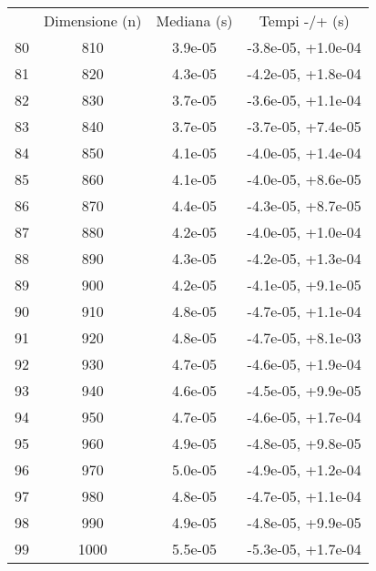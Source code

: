 \begin{table}
\centering
\begin{adjustbox}{width=1\textwidth/2}
\begin{tabular}{|c|c|c|c|}
\hline
 & Dimensione (n) & Mediana (s) & Tempi -/+ (s) \\
80 & 810 & 3.9e-05 & -3.8e-05, +1.0e-04 \\
\cline{1-4}
81 & 820 & 4.3e-05 & -4.2e-05, +1.8e-04 \\
\cline{1-4}
82 & 830 & 3.7e-05 & -3.6e-05, +1.1e-04 \\
\cline{1-4}
83 & 840 & 3.7e-05 & -3.7e-05, +7.4e-05 \\
\cline{1-4}
84 & 850 & 4.1e-05 & -4.0e-05, +1.4e-04 \\
\cline{1-4}
85 & 860 & 4.1e-05 & -4.0e-05, +8.6e-05 \\
\cline{1-4}
86 & 870 & 4.4e-05 & -4.3e-05, +8.7e-05 \\
\cline{1-4}
87 & 880 & 4.2e-05 & -4.0e-05, +1.0e-04 \\
\cline{1-4}
88 & 890 & 4.3e-05 & -4.2e-05, +1.3e-04 \\
\cline{1-4}
89 & 900 & 4.2e-05 & -4.1e-05, +9.1e-05 \\
\cline{1-4}
90 & 910 & 4.8e-05 & -4.7e-05, +1.1e-04 \\
\cline{1-4}
91 & 920 & 4.8e-05 & -4.7e-05, +8.1e-03 \\
\cline{1-4}
92 & 930 & 4.7e-05 & -4.6e-05, +1.9e-04 \\
\cline{1-4}
93 & 940 & 4.6e-05 & -4.5e-05, +9.9e-05 \\
\cline{1-4}
94 & 950 & 4.7e-05 & -4.6e-05, +1.7e-04 \\
\cline{1-4}
95 & 960 & 4.9e-05 & -4.8e-05, +9.8e-05 \\
\cline{1-4}
96 & 970 & 5.0e-05 & -4.9e-05, +1.2e-04 \\
\cline{1-4}
97 & 980 & 4.8e-05 & -4.7e-05, +1.1e-04 \\
\cline{1-4}
98 & 990 & 4.9e-05 & -4.8e-05, +9.9e-05 \\
\cline{1-4}
99 & 1000 & 5.5e-05 & -5.3e-05, +1.7e-04 \\
\cline{1-4}
\end{tabular}
\end{adjustbox}
\end{table}
